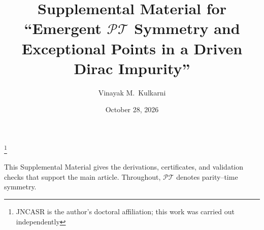 \documentclass[%
  aps,physrev,onecolumn,10pt,amsmath,amssymb,superscriptaddress,longbibliography,floatfix
]{revtex4-2}
\newcommand{\PT}{\mathcal{PT}}
\begin{document}
\title{Supplemental Material for ``Emergent \texorpdfstring{$\PT$}{PT} Symmetry and Exceptional Points in a Driven Dirac Impurity''}
\author{Vinayak M.~Kulkarni}
\thanks{JNCASR is the author's doctoral affiliation; this work was carried out independently}
\date{October 28, 2026}
\maketitle
\setcounter{figure}{0}
\renewcommand{\thefigure}{S\arabic{figure}}

This Supplemental Material gives the derivations, certificates, and validation checks that support the main article.
Throughout, $\PT$ denotes parity--time symmetry.
\end{document}
